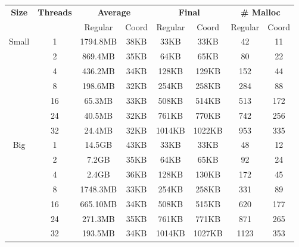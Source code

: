 \begin{tabular}{c | c || c c | c c | c c} \hline
	 \multirow{2}{*}{\textbf{Size}} & \multirow{2}{*}{\textbf{Threads}} & \multicolumn{2}{c|}{\textbf{Average}} & \multicolumn{2}{c|}{\textbf{Final}} & \multicolumn{2}{c}{\textbf{\# Malloc}}\\
	 & & Regular & Coord & Regular & Coord & Regular & Coord\\ \hline \hline
\multirow{7}{*}{Small}  & 1 &  1794.8MB & 38KB &  33KB & 33KB &  42 & 11\\
 & 2 &  869.4MB & 35KB &  64KB & 65KB &  80 & 22\\
 & 4 &  436.2MB & 34KB &  128KB & 129KB &  152 & 44\\
 & 8 &  198.6MB & 32KB &  254KB & 258KB &  284 & 88\\
 & 16 &  65.3MB & 33KB &  508KB & 514KB &  513 & 172\\
 & 24 &  40.5MB & 32KB &  761KB & 770KB &  742 & 256\\
 & 32 &  24.4MB & 32KB &  1014KB & 1022KB &  953 & 335\\
\hline
\multirow{7}{*}{Big}  & 1 &  14.5GB & 43KB &  33KB & 33KB &  48 & 12\\
 & 2 &  7.2GB & 35KB &  64KB & 65KB &  92 & 24\\
 & 4 &  2.4GB & 36KB &  128KB & 130KB &  172 & 45\\
 & 8 &  1748.3MB & 33KB &  254KB & 258KB &  331 & 89\\
 & 16 &  665.10MB & 34KB &  508KB & 515KB &  620 & 177\\
 & 24 &  271.3MB & 35KB &  761KB & 771KB &  871 & 265\\
 & 32 &  193.5MB & 34KB &  1014KB & 1027KB &  1123 & 353\\
\hline
\end{tabular}
